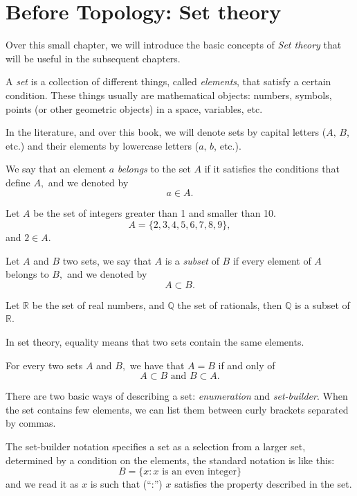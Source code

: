 \documentclass[
	fontsize=10pt, %
	twoside=false, %
	secnumdepth=1, %
]{kaobook}
\begin{document}
\chapter*{Before Topology: Set theory}

Over this small chapter, we will introduce the basic concepts of \emph{Set theory} that will be useful in the subsequent chapters.

A \emph{set} is a collection of different things, called \emph{elements}, that satisfy a certain condition. These things usually are mathematical objects: numbers, symbols, points (or other geometric objects) in a space, variables, etc. 

In the literature, and over this book, we will denote sets by capital letters ($A, \, B$, etc.) and their elements by lowercase letters ($a,\, b$, etc.). 

We say that an element $a$ \emph{belongs} to the set $A$ if it satisfies the conditions that define $A,$ and we denoted by $$a\in A.$$

\begin{example}
Let $A$ be the set of integers greater than 1 and smaller than 10. $$A=\{2,3,4,5,6,7,8,9\},$$ and $2\in A.$
\end{example}

\begin{definition}[Subset]
Let $A$ and $B$ two sets, we say that $A$ is a \emph{subset} of $B$ if every element of $A$ belongs to $B,$ and we denoted by $$A\subset B.$$
\end{definition}

\begin{example}
Let $\mathbb{R}$ be the set of real numbers, and $\mathbb{Q}$ the set of rationals, then $\mathbb{Q}$ is a subset of $\mathbb{R}.$
\end{example}

In set theory, equality means that two sets contain the same elements.

\begin{lemma}
For every two sets $A$ and $B,$ we have that $A=B$ if and only of $$A\subset B \mbox{ and } B\subset A.$$
\end{lemma}

There are two basic ways of describing a set: \emph{enumeration} and \emph{set-builder}. When the set contains few elements, we can list them between curly brackets separated by commas.

 The set-builder notation specifies a set as a selection from a larger set, determined by a condition on the elements, the standard notation is like this: $$B=\{x: x\mbox{ is an even integer}\}$$ and we read it as $x$ is such that (``:'') $x$ satisfies the property described in the set.
 
\end{document}

